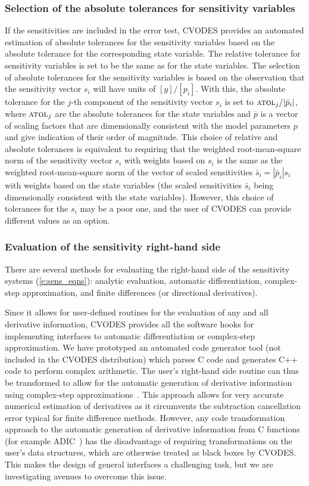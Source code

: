 \subsubsection{Selection of the absolute tolerances for sensitivity variables}
If the sensitivities are included in the error test, CVODES provides an 
automated estimation of absolute tolerances for the sensitivity variables 
based on the absolute tolerance for the corresponding state variable.
The relative tolerance for sensitivity variables is set to be the same as for 
the state variables. The selection of absolute tolerances for the sensitivity 
variables is based on the observation that the sensitivity vector $s_i$ will have 
units of $[y]/[p_i]$.
With this, the absolute tolerance for the $j$-th component of the sensitivity
vector $s_i$ is set to ${\mbox{\sc atol}_j}/{|{\bar p}_i|}$,
where $\mbox{\sc atol}_j$ are the absolute tolerances for the state variables and $\bar p$
is a vector of scaling factors that are dimensionally consistent with
the model parameters $p$ and give indication of their order of magnitude.
This choice of relative and absolute tolerances is equivalent 
to requiring that the weighted root-mean-square norm of the sensitivity 
vector $s_i$ with weights based on $s_i$ is the same as the
weighted root-mean-square norm of the vector of scaled sensitivities 
${\bar s}_i = |{\bar p}_i| s_i$ with weights based on the state variables
(the scaled sensitivities ${\bar s}_i$ being dimensionally consistent with the
state variables).
%
However, this choice of tolerances for the $s_i$ may be a poor one, and the user 
of CVODES can provide different values as an option.

\subsubsection{Evaluation of the sensitivity right-hand side}
There are several methods for evaluating the right-hand side of the sensitivity 
systems (\ref{e:sens_eqns}): analytic evaluation, automatic differentiation, 
complex-step approximation, and finite differences (or directional derivatives).

Since it allows for user-defined routines for the evaluation of any and all 
derivative information, CVODES provides all the software hooks for implementing 
interfaces to automatic differentiation or complex-step approximation. 
We have prototyped an automated code generator tool (not included in
the CVODES distribution) which parses C code and generates C++ code to
perform complex arithmetic. The user's right-hand side routine can
thus be transformed to allow for the automatic generation of
derivative information using complex-step approximations~\cite{MSA:03}.
This approach allows for very accurate numerical estimation of
derivatives as it circumvents the subtraction cancellation error
typical for finite difference methods. However, any code
transformation approach to the automatic generation of derivative
information from C functions (for example ADIC~\cite{BRM:97})
has the disadvantage of requiring transformations on the user's data
structures, which are otherwise treated as black boxes by CVODES.
This makes the design of general interfaces a challenging task, but we 
are investigating avenues to overcome this issue.

